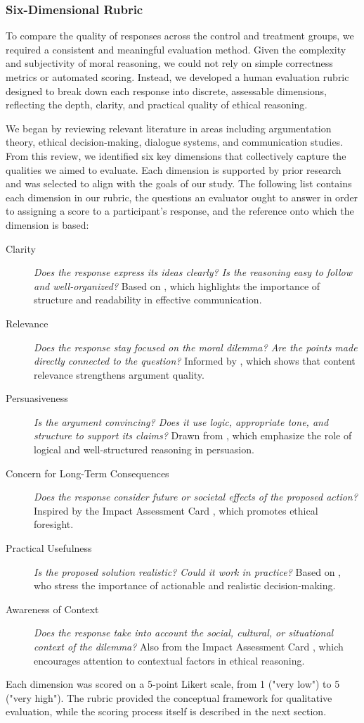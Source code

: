 \subsubsection{Six-Dimensional Rubric}
\label{sec:rubric}

To compare the quality of responses across the control and treatment groups, we required a consistent and meaningful evaluation method. Given the complexity and subjectivity of moral reasoning, we could not rely on simple correctness metrics or automated scoring. Instead, we developed a human evaluation rubric designed to break down each response into discrete, assessable dimensions, reflecting the depth, clarity, and practical quality of ethical reasoning.

We began by reviewing relevant literature in areas including argumentation theory, ethical decision-making, dialogue systems, and communication studies. From this review, we identified six key dimensions that collectively capture the qualities we aimed to evaluate. Each dimension is supported by prior research and was selected to align with the goals of our study.
The following list contains each dimension in our rubric, the questions an evaluator ought to answer in order to assigning a score to a participant's response, and the reference onto which the dimension is based:

\begin{description}
  \item[Clarity] \textit{Does the response express its ideas clearly? Is the reasoning easy to follow and well-organized?}
    Based on \citep{mctear2005spoken}, which highlights the importance of structure and readability in effective communication.
  \item[Relevance] \textit{Does the response stay focused on the moral dilemma? Are the points made directly connected to the question?}
    Informed by \citet{habernal2016argument}, which shows that content relevance strengthens argument quality.
  \item[Persuasiveness] \textit{Is the argument convincing? Does it use logic, appropriate tone, and structure to support its claims?}
    Drawn from \citet{johnson2006logical}, which emphasize the role of logical and well-structured reasoning in persuasion.
  \item[Concern for Long-Term Consequences] \textit{Does the response consider future or societal effects of the proposed action?}
    Inspired by the Impact Assessment Card \citep{impactassessment2018cscw}, which promotes ethical foresight.
  \item[Practical Usefulness] \textit{Is the proposed solution realistic? Could it work in practice?}
    Based on \citet{bazerman2012judgment}, who stress the importance of actionable and realistic decision-making.
  \item[Awareness of Context] \textit{Does the response take into account the social, cultural, or situational context of the dilemma?}
    Also from the Impact Assessment Card \citep{impactassessment2018cscw}, which encourages attention to contextual factors in ethical reasoning.
\end{description}

Each dimension was scored on a 5-point Likert scale, from 1 ("very low") to 5 ("very high"). The rubric provided the conceptual framework for qualitative evaluation, while the scoring process itself is described in the next section.
